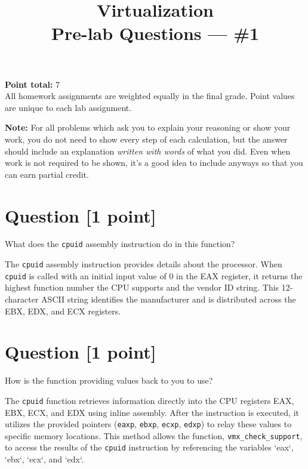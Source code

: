 \documentclass[11pt]{article}
\providecommand{\due}{}
\begin{document}
\title{Virtualization\\Pre-lab Questions --- \#1}
\date{\due}

\maketitle

\noindent \textbf{Point total:} 7
\\ All homework assignments are weighted equally in the final grade. Point values are unique to each lab assignment.

\textbf{Note:} For all problems which ask you to explain your reasoning or show your work, you do not need to show every step of each calculation, but the answer should include an explanation \emph{written with words} of what you did.  Even when work is not required to be shown, it’s a good idea to include anyways so that you can earn partial credit.

\section{Question [1 point]}

What does the \texttt{cpuid} assembly instruction do in this function?

\begin{solution}
    \item The \texttt{cpuid} assembly instruction provides details about the processor. When \texttt{cpuid} is called with an initial input value of 0 in the EAX register, it returns the highest function number the CPU supports and the vendor ID string. This 12-character ASCII string identifies the manufacturer and is distributed across the EBX, EDX, and ECX registers.
\end{solution}


\section{Question [1 point]}

How is the function providing values back to you to use?

\begin{solution}
    \item The \texttt{cpuid} function retrieves information directly into the CPU registers EAX, EBX, ECX, and EDX using inline assembly. After the instruction is executed, it utilizes the provided pointers (\texttt{eaxp}, \texttt{ebxp}, \texttt{ecxp}, \texttt{edxp}) to relay these values to specific memory locations. This method allows the function, \texttt{vmx\_check\_support}, to access the results of the \texttt{cpuid} instruction by referencing the variables `eax`, `ebx`, `ecx`, and `edx`.

\end{solution}
\end{document}
